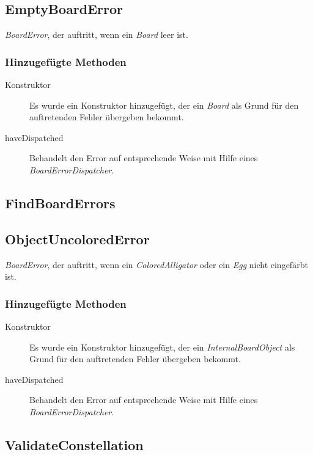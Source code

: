 \subsection{EmptyBoardError}
	\emph{BoardError}, der auftritt, wenn ein \emph{Board} leer ist.
	\subsubsection{Hinzugefügte Methoden}
	\begin{description}
		\item[Konstruktor] Es wurde ein Konstruktor hinzugefügt, der ein \emph{Board} als Grund für den auftretenden 
			Fehler übergeben bekommt.
		\item[haveDispatched]
			Behandelt den Error auf entsprechende Weise mit Hilfe eines \emph{BoardErrorDispatcher}.
	\end{description}

\subsection{FindBoardErrors}

\subsection{ObjectUncoloredError}
	\emph{BoardError}, der auftritt, wenn ein \emph{ColoredAlligator} oder ein \emph{Egg} nicht eingefärbt ist.
	\subsubsection{Hinzugefügte Methoden}
	\begin{description}
		\item[Konstruktor] Es wurde ein Konstruktor hinzugefügt, der ein \emph{InternalBoardObject} als Grund für den 
			auftretenden Fehler übergeben bekommt.
		\item[haveDispatched]
			Behandelt den Error auf entsprechende Weise mit Hilfe eines \emph{BoardErrorDispatcher}.
	\end{description}

\subsection{ValidateConstellation}
